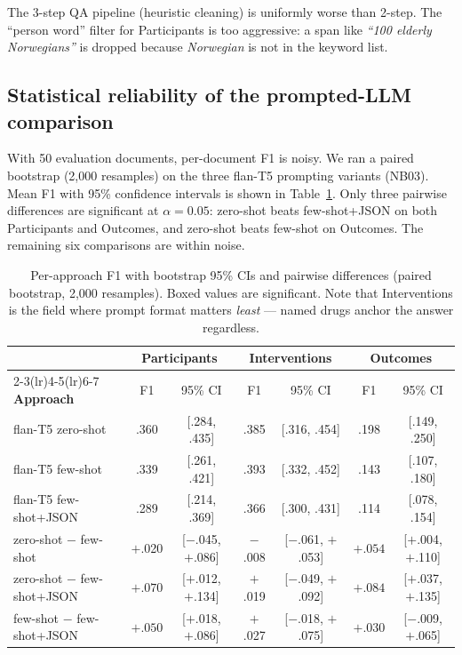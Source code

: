 \documentclass[11pt]{article}
\begin{document}
The 3-step QA pipeline (heuristic cleaning) is uniformly worse than
2-step. The ``person word'' filter for Participants is too aggressive:
a span like \textit{``100 elderly Norwegians''} is dropped because
\textit{Norwegian} is not in the keyword list.

\subsection{Statistical reliability of the prompted-LLM comparison}

With 50 evaluation documents, per-document F1 is noisy. We ran a paired
bootstrap (2{,}000 resamples) on the three flan-T5 prompting variants
(NB03). Mean F1 with 95\% confidence intervals is shown in
Table~\ref{tab:bootstrap}. Only three pairwise differences are
significant at $\alpha\!=\!0.05$: zero-shot beats few-shot+JSON on both
Participants and Outcomes, and zero-shot beats few-shot on Outcomes.
The remaining six comparisons are within noise.

\begin{table}[tbp]
\centering
\small
\begin{tabular}{l c c c c c c}
\toprule
& \multicolumn{2}{c}{\textbf{Participants}} & \multicolumn{2}{c}{\textbf{Interventions}} & \multicolumn{2}{c}{\textbf{Outcomes}} \\
\cmidrule(lr){2-3}\cmidrule(lr){4-5}\cmidrule(lr){6-7}
\textbf{Approach} & F1 & 95\% CI & F1 & 95\% CI & F1 & 95\% CI \\
\midrule
flan-T5 zero-shot     & .360 & [.284, .435] & .385 & [.316, .454] & .198 & [.149, .250] \\
flan-T5 few-shot      & .339 & [.261, .421] & .393 & [.332, .452] & .143 & [.107, .180] \\
flan-T5 few-shot+JSON & .289 & [.214, .369] & .366 & [.300, .431] & .114 & [.078, .154] \\
\midrule
zero-shot $-$ few-shot       & $+$.020 & [$-$.045, $+$.086] & $-$.008 & [$-$.061, $+$.053] & $\boxed{+.054}$ & [$+$.004, $+$.110] \\
zero-shot $-$ few-shot+JSON  & $\boxed{+.070}$ & [$+$.012, $+$.134] & $+$.019 & [$-$.049, $+$.092] & $\boxed{+.084}$ & [$+$.037, $+$.135] \\
few-shot  $-$ few-shot+JSON  & $\boxed{+.050}$ & [$+$.018, $+$.086] & $+$.027 & [$-$.018, $+$.075] & $+$.030 & [$-$.009, $+$.065] \\
\bottomrule
\end{tabular}
\caption{Per-approach F1 with bootstrap 95\% CIs and pairwise
differences (paired bootstrap, 2{,}000 resamples). Boxed values are
significant. Note that Interventions is the field where prompt format
matters \textit{least} --- named drugs anchor the answer regardless.}
\label{tab:bootstrap}
\end{table}
\end{document}
